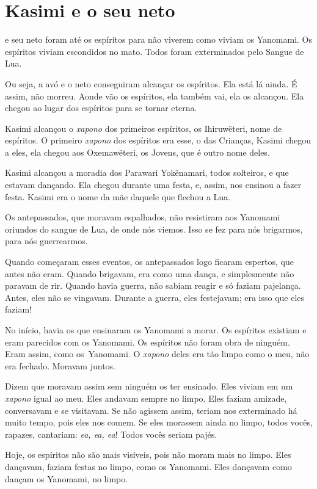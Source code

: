 \chapter{Kasimi e o seu neto}

 e seu neto foram até os espíritos para não viverem como viviam
os Yanomami. Os espíritos viviam escondidos no mato. Todos foram
exterminados pelo Sangue de Lua.

Ou seja, a avó e o neto conseguiram alcançar os espíritos. Ela está lá ainda. É assim, não morreu. Aonde vão os espíritos, ela também vai, ela os
alcançou. Ela chegou ao lugar dos espíritos para se tornar eterna.

Kasimi alcançou o \textit{xapono} dos primeiros espíritos, os Ihiruwëteri, nome
de espíritos. O primeiro \textit{xapono} dos espíritos era esse, o das
Crianças, Kasimi chegou a eles, ela chegou aos
Oxemawëteri, os Jovens, que é outro nome deles. 

Kasimi alcançou a moradia dos Parawari Yokënamari, todos solteiros, e que
estavam dançando. Ela chegou durante uma festa, e, assim, nos ensinou a
fazer festa. Kasimi era o nome da mãe daquele que flechou a Lua.

Os antepassados, que moravam espalhados, não resistiram aos Yanomami
oriundos do sangue de Lua, de onde nós viemos. Isso se fez para nós
brigarmos, para nós guerrearmos. 

Quando começaram esses eventos, os antepassados logo ficaram espertos,
que antes não eram. Quando brigavam, era como uma dança, e
simplesmente não paravam de rir. Quando havia guerra, não sabiam reagir
e só faziam pajelança. Antes, eles não se vingavam.
Durante a guerra, eles festejavam; era isso que eles faziam! 

No início, havia os que ensinaram os Yanomami a morar. Os espíritos
existiam e eram parecidos com os Yanomami. Os espíritos não foram obra
de ninguém. Eram assim, como os~Yanomami. O \textit{xapono} deles era tão limpo
como o meu, não era fechado. Moravam juntos.

Dizem que moravam assim sem ninguém os ter ensinado. Eles viviam em um \textit{xapono}
igual ao meu. Eles andavam sempre no limpo. Eles faziam amizade,
conversavam e se visitavam. Se não agissem assim, teriam nos exterminado
há muito tempo, pois eles nos comem. Se eles morassem ainda no limpo,
todos vocês, rapazes, cantariam: \textit{ea, ea, ea}! Todos vocês seriam
pajés. 

Hoje, os espíritos não são mais visíveis, pois não moram mais no limpo.
Eles dançavam, faziam festas no limpo, como os Yanomami. Eles dançavam
como dançam os Yanomami, no limpo. 

